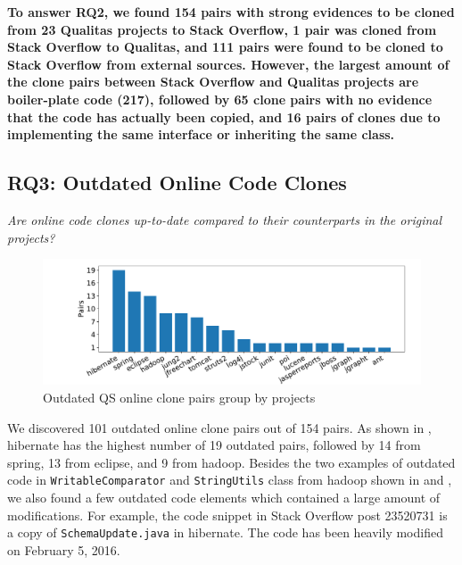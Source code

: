 \documentclass[10pt,journal,compsoc]{IEEEtran}
\begin{document}
\textbf{To answer RQ2, we found 154 pairs with
	strong evidences to be cloned from 23 Qualitas projects to Stack Overflow, 1 pair
	was cloned from Stack Overflow to Qualitas, and
	111 pairs were found to be cloned to Stack Overflow from external
	sources. However, the largest amount of the clone pairs
	between Stack Overflow and Qualitas projects are \linebreak boiler-plate code
	(217), followed by 65 clone pairs with no evidence that the code has actually been copied,
	and 16 pairs of clones due to implementing the same interface or inheriting the same class.} 


\subsection{RQ3: Outdated Online Code Clones}
\vspace{0.25cm}
\textit{Are online code clones up-to-date compared to their counterparts in the original projects?}
\vspace{0.25cm}

\begin{figure}
	\centering
	\includegraphics[width=0.8\linewidth]{outdated}
	\caption{Outdated QS online clone pairs group by projects}
	\label{fig:outdated}
\end{figure}

We discovered 101 outdated online clone pairs out of 154 pairs. As shown in
, \textsf{hibernate} has the highest number of 19 outdated
pairs, followed by 14 from \textsf{spring}, 13 from \textsf{eclipse}, and 9 from
\textsf{hadoop}. Besides the two examples of outdated code in %
{\small{\texttt{WritableComparator}}} and
{\small{\texttt{StringUtils}}} class from \textsf{hadoop} shown in
 and , we also found a few
outdated code elements which contained a large amount of modifications. For
example, the code snippet in Stack Overflow post 23520731 is a copy of
{\small{\texttt{SchemaUpdate.java}}} in \textsf{hibernate}. The code has been
heavily modified on February 5, 2016.

\end{document}

